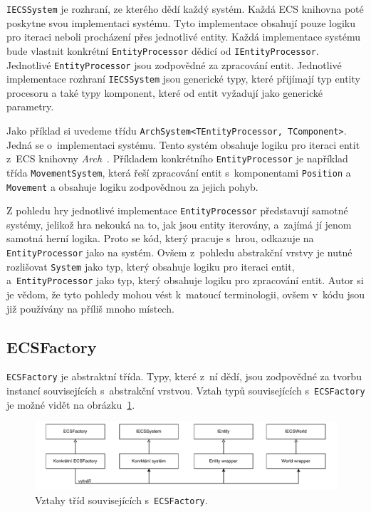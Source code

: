 \texttt{IECSSystem} je rozhraní, ze kterého dědí každý systém. Každá ECS knihovna poté poskytne svou implementaci systému. Tyto implementace obsahují pouze logiku pro iteraci neboli procházení přes jednotlivé entity. Každá implementace systému bude vlastnit konkrétní \texttt{EntityProcessor} dědicí od \texttt{IEntityProcessor}. Jednotlivé \texttt{EntityProcessor} jsou zodpovědné za zpracování entit. Jednotlivé implementace rozhraní \texttt{IECSSystem} jsou generické typy, které přijímají typ entity procesoru a také typy komponent, které od entit vyžadují jako generické parametry.

Jako příklad si uvedeme třídu \texttt{ArchSystem<TEntityProcessor, TComponent>}. Jedná se o~implementaci systému. Tento systém obsahuje logiku pro iteraci entit z~ECS knihovny \textit{Arch}~\cite{Arch}. Příkladem konkrétního \texttt{EntityProcessor} je například třída \texttt{MovementSystem}, která řeší zpracování entit s~komponentami \texttt{Position} a \texttt{Movement} a obsahuje logiku zodpovědnou za jejich pohyb.

Z pohledu hry jednotlivé implementace \texttt{EntityProcessor} představují samotné systémy, jelikož hra nekouká na to, jak jsou entity iterovány, a~zajímá jí jenom samotná herní logika. Proto se kód, který pracuje s~hrou, odkazuje na \texttt{EntityProcessor} jako na systém. Ovšem z~pohledu abstrakční vrstvy je nutné rozlišovat \texttt{System} jako typ, který obsahuje logiku pro iteraci entit, a~\texttt{EntityProcessor} jako typ, který obsahuje logiku pro zpracování entit. Autor si je vědom, že tyto pohledy mohou vést k~matoucí terminologii, ovšem v~kódu jsou již používány na příliš mnoho místech.

\subsection{ECSFactory}
\texttt{ECSFactory} je abstraktní třída. Typy, které z~ní dědí, jsou zodpovědné za tvorbu instancí souvisejících s~abstrakční vrstvou. Vztah typů souvisejících s~\texttt{ECSFactory} je možné vidět na obrázku~\ref{fig:abstract-layer-ecsfactory}.

\begin{figure}[!htb]
  \centering
  \includegraphics[width=1.0\linewidth]{img/abstract-layer-ecsfactory.pdf}
  \caption{Vztahy tříd souvisejících s~\texttt{ECSFactory}.}
  \label{fig:abstract-layer-ecsfactory}
\end{figure}

